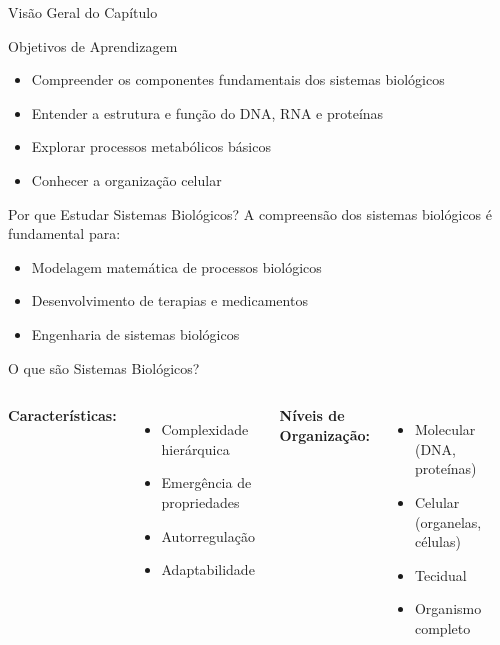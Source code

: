 \begin{frame}[allowframebreaks]{Visão Geral do Capítulo}
\begin{block}{Objetivos de Aprendizagem}
\begin{itemize}
    \item Compreender os componentes fundamentais dos sistemas biológicos
    \item Entender a estrutura e função do DNA, RNA e proteínas
    \item Explorar processos metabólicos básicos
    \item Conhecer a organização celular
\end{itemize}
\end{block}

\vspace{0.5cm}

\begin{exampleblock}{Por que Estudar Sistemas Biológicos?}
A compreensão dos sistemas biológicos é fundamental para:
\begin{itemize}
    \item Modelagem matemática de processos biológicos
    \item Desenvolvimento de terapias e medicamentos
    \item Engenharia de sistemas biológicos
\end{itemize}
\end{exampleblock}
\end{frame}

\begin{frame}[allowframebreaks]{O que são Sistemas Biológicos?}

\vspace{0.5cm}

\begin{columns}
\textbf{Características:}
\begin{itemize}
    \item Complexidade hierárquica
    \item Emergência de propriedades
    \item Autorregulação
    \item Adaptabilidade
\end{itemize}

\textbf{Níveis de Organização:}
\begin{itemize}
    \item Molecular (DNA, proteínas)
    \item Celular (organelas, células)
    \item Tecidual
    \item Organismo completo
\end{itemize}
\end{columns}
\end{frame}

